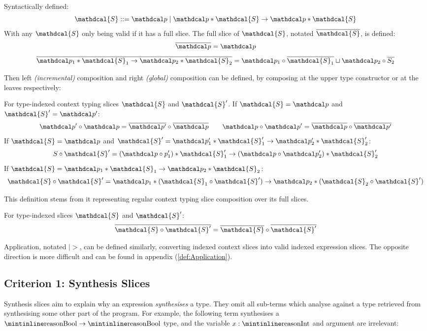 \renewcommand{\S}{\mathdcal{S}}
\renewcommand{\s}{\mathdcal{s}}
\begin{definition}
Syntactically defined: 
\[\S ::= \p \mid \p * \S \to \p * \S\] 
With any $\S$ only being valid if it has a full slice. The full slice of $\S$, notated $\overline{\S}$, is defined:
\[\overline{\p} = \p\]
\[\overline{\p_1 * \S_1 \to \p_2 * \S_2} = \p_1 \circ \overline{\S_1} \sqcup \p_2 \circ \overline{S_2}\]
\end{definition}
Then left \textit{(incremental)} composition and right \textit{(global)} composition can be defined, by composing at the upper type constructor or at the leaves respectively:
\begin{definition}
For type-indexed context typing slices $\S$ and $\S'$.  If $\S = \p$ and $\S' = \p'$:
\[\p' \circ \p = \overline{\p'} \circ \overline{\p}\qquad \p \circ \p' = \overline{\p} \circ \overline{\p'}\]
If $\S = \p$ and $\S' = \p_1' * \S_1' \to \p_2' * \S_2'$:
\[S \circ \S' = (\p \circ p_1') * \S_1' \to (\p \circ \p_2') * \S_2'\]
If $\S = \p_1 * \S_1 \to \p_2 * \S_2$:
\[\S \circ \S' = \p_1 * (\S_1 \circ \S') \to \p_2 * (\S_2 \circ \S')\]
\end{definition}

This definition stems from it representing regular context typing slice composition over its full slices.
\begin{proposition}
For type-indexed slices $\S$ and $\S'$: 
\[\overline{\S \circ \S'} = \overline{\S} \circ \overline{\S'}\]
\end{proposition}
Application, notated $\mid>$, can be defined similarly, converting indexed context slices into valid indexed expression slices. The opposite direction is more difficult and can be found in appendix (\cref{def:Application}).


\subsection{Criterion 1: Synthesis Slices}
\label{sec:SynthesisSlices}

Synthesis slices aim to explain why an expression \textit{synthesises} a type. They omit all sub-terms which analyse against a type retrieved from synthesising some other part of the program. For example, the following term synthesises a $\code{Bool} \to \code{Bool}$ type, and the variable $x : \code{Int}$ and argument are irrelevant:

